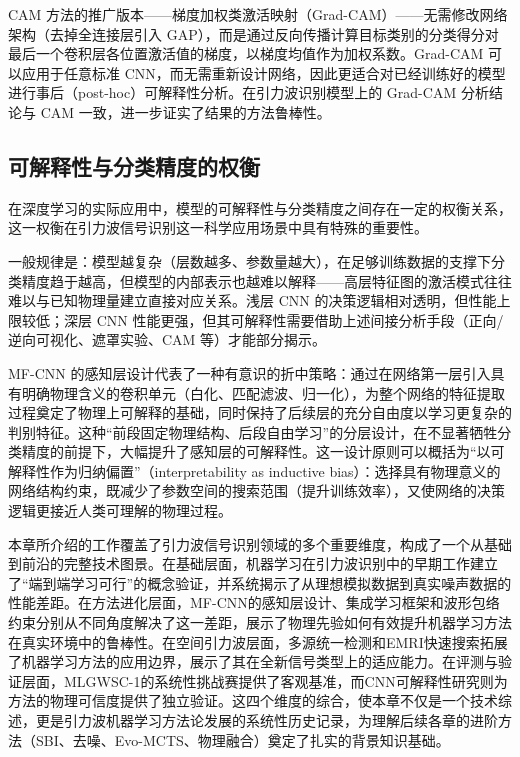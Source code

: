 CAM 方法的推广版本——梯度加权类激活映射（Grad-CAM）——无需修改网络架构（去掉全连接层引入 GAP），而是通过反向传播计算目标类别的分类得分对最后一个卷积层各位置激活值的梯度，以梯度均值作为加权系数。Grad-CAM 可以应用于任意标准 CNN，而无需重新设计网络，因此更适合对已经训练好的模型进行事后（post-hoc）可解释性分析。在引力波识别模型上的 Grad-CAM 分析结论与 CAM 一致，进一步证实了结果的方法鲁棒性。

\subsection{可解释性与分类精度的权衡}

在深度学习的实际应用中，模型的可解释性与分类精度之间存在一定的权衡关系，这一权衡在引力波信号识别这一科学应用场景中具有特殊的重要性。

一般规律是：模型越复杂（层数越多、参数量越大），在足够训练数据的支撑下分类精度趋于越高，但模型的内部表示也越难以解释——高层特征图的激活模式往往难以与已知物理量建立直接对应关系。浅层 CNN 的决策逻辑相对透明，但性能上限较低；深层 CNN 性能更强，但其可解释性需要借助上述间接分析手段（正向/逆向可视化、遮罩实验、CAM 等）才能部分揭示。

MF-CNN 的感知层设计代表了一种有意识的折中策略：通过在网络第一层引入具有明确物理含义的卷积单元（白化、匹配滤波、归一化），为整个网络的特征提取过程奠定了物理上可解释的基础，同时保持了后续层的充分自由度以学习更复杂的判别特征。这种“前段固定物理结构、后段自由学习”的分层设计，在不显著牺牲分类精度的前提下，大幅提升了感知层的可解释性。这一设计原则可以概括为“以可解释性作为归纳偏置”（interpretability as inductive bias）：选择具有物理意义的网络结构约束，既减少了参数空间的搜索范围（提升训练效率），又使网络的决策逻辑更接近人类可理解的物理过程。

本章所介绍的工作覆盖了引力波信号识别领域的多个重要维度，构成了一个从基础到前沿的完整技术图景。在基础层面，机器学习在引力波识别中的早期工作建立了“端到端学习可行”的概念验证，并系统揭示了从理想模拟数据到真实噪声数据的性能差距。在方法进化层面，MF-CNN的感知层设计、集成学习框架和波形包络约束分别从不同角度解决了这一差距，展示了物理先验如何有效提升机器学习方法在真实环境中的鲁棒性。在空间引力波层面，多源统一检测和EMRI快速搜索拓展了机器学习方法的应用边界，展示了其在全新信号类型上的适应能力。在评测与验证层面，MLGWSC-1的系统性挑战赛提供了客观基准，而CNN可解释性研究则为方法的物理可信度提供了独立验证。这四个维度的综合，使本章不仅是一个技术综述，更是引力波机器学习方法论发展的系统性历史记录，为理解后续各章的进阶方法（SBI、去噪、Evo-MCTS、物理融合）奠定了扎实的背景知识基础。

